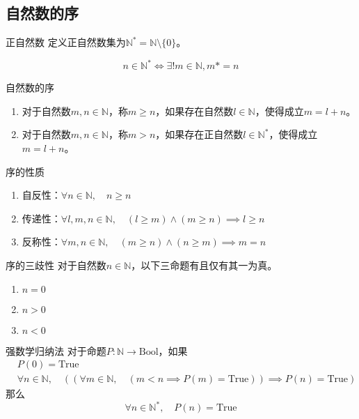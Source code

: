 \documentclass[lang = cn, scheme = chinese, thmcnt = section]{elegantbook}
\newcommand{\N}{\mathbb{N}}            %
\begin{document}
\subsection{自然数的序}

\begin{definition}{正自然数}
	定义正自然数集为$\N^*=\N\setminus\{0\}$。
\end{definition}

\begin{proposition}
	$$
	n\in\N^*\iff
	\exists!m\in\N,m*=n
	$$
\end{proposition}

\begin{definition}{自然数的序}
	\begin{enumerate}
		\item 对于自然数$m,n\in\N$，称$m \ge n$，如果存在自然数$l\in\N$，使得成立$m=l+n$。
		\item 对于自然数$m,n\in\N$，称$m > n$，如果存在正自然数$l\in\N^*$，使得成立$m=l+n$。
	\end{enumerate}
\end{definition}

\begin{proposition}{序的性质}
	\begin{enumerate}
		\item 自反性：$\forall n\in\N,\quad n \ge n$
		\item 传递性：$\forall l,m,n\in\N,\quad (l\ge m)\wedge(m\ge n)\implies l\ge n$
		\item 反称性：$\forall m,n\in\N,\quad (m\ge n)\wedge(n\ge m)\implies m=n$
	\end{enumerate}
\end{proposition}

\begin{theorem}{序的三歧性}
	对于自然数$n\in\N$，以下三命题有且仅有其一为真。
	\begin{enumerate}
		\item $n=0$
		\item $n>0$
		\item $n<0$
	\end{enumerate}
\end{theorem}

\begin{theorem}{强数学归纳法}
	对于命题$P:\N\to\text{Bool}$，如果
	\begin{align*}
		& P(0)=\text{True}\\
		& \forall n\in \N,\quad ((\forall m\in \N,\quad (m< n\implies P(m)=\text{True}))\implies P(n)=\text{True})
	\end{align*}
	那么
	$$
	\forall n\in\N^*,\quad P(n)=\text{True}
	$$
\end{theorem}
\end{document}
